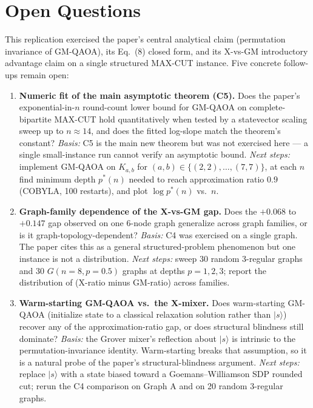 \section{Open Questions}

This replication exercised the paper's central analytical claim (permutation invariance of GM-QAOA), its Eq.~(8) closed form, and its X-vs-GM introductory advantage claim on a single structured MAX-CUT instance. Five concrete follow-ups remain open:

\begin{enumerate}
  \item \textbf{Numeric fit of the main asymptotic theorem (C5).} Does the paper's exponential-in-$n$ round-count lower bound for GM-QAOA on complete-bipartite MAX-CUT hold quantitatively when tested by a statevector scaling sweep up to $n \approx 14$, and does the fitted log-slope match the theorem's constant?
  \emph{Basis:} C5 is the main new theorem but was not exercised here --- a single small-instance run cannot verify an asymptotic bound.
  \emph{Next steps:} implement GM-QAOA on $K_{a,b}$ for $(a,b) \in \{(2,2),\ldots,(7,7)\}$, at each $n$ find minimum depth $p^\ast(n)$ needed to reach approximation ratio $0.9$ (COBYLA, 100 restarts), and plot $\log p^\ast(n)$ vs.\ $n$.

  \item \textbf{Graph-family dependence of the X-vs-GM gap.} Does the $+0.068$ to $+0.147$ gap observed on one 6-node graph generalize across graph families, or is it graph-topology-dependent?
  \emph{Basis:} C4 was exercised on a single graph. The paper cites this as a general structured-problem phenomenon but one instance is not a distribution.
  \emph{Next steps:} sweep 30 random 3-regular graphs and 30 $G(n{=}8,p{=}0.5)$ graphs at depths $p=1,2,3$; report the distribution of (X-ratio minus GM-ratio) across families.

  \item \textbf{Warm-starting GM-QAOA vs.\ the X-mixer.} Does warm-starting GM-QAOA (initialize state to a classical relaxation solution rather than $|s\rangle$) recover any of the approximation-ratio gap, or does structural blindness still dominate?
  \emph{Basis:} the Grover mixer's reflection about $|s\rangle$ is intrinsic to the permutation-invariance identity. Warm-starting breaks that assumption, so it is a natural probe of the paper's structural-blindness argument.
  \emph{Next steps:} replace $|s\rangle$ with a state biased toward a Goemans--Williamson SDP rounded cut; rerun the C4 comparison on Graph A and on 20 random 3-regular graphs.


\end{enumerate}
